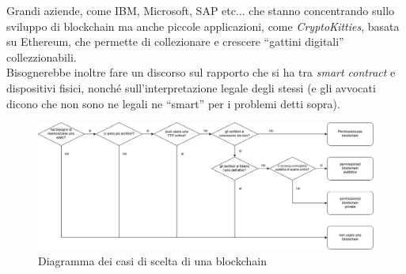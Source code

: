 \documentclass[a4paper,12pt, oneside]{book}
\begin{document}
Grandi aziende, come IBM, Microsoft, SAP etc$\ldots$ che stanno concentrando
sullo sviluppo di blockchain ma anche piccole applicazioni, come
\textit{CryptoKitties}, basata su Ethereum, che permette di collezionare
e crescere ``gattini digitali'' collezzionabili.\\
Bisognerebbe inoltre fare un discorso sul rapporto che si ha tra \textit{smart
  contract} e dispositivi fisici, nonché sull'interpretazione legale degli
stessi (e gli avvocati dicono che non sono ne legali ne ``smart'' per i problemi
detti sopra).
\begin{figure}
  \centering
  \includegraphics[scale = 0.33]{img/blockchain.png}
  \caption{Diagramma dei casi di scelta di una blockchain}
  \label{fig:bcd}
\end{figure}
\end{document}
